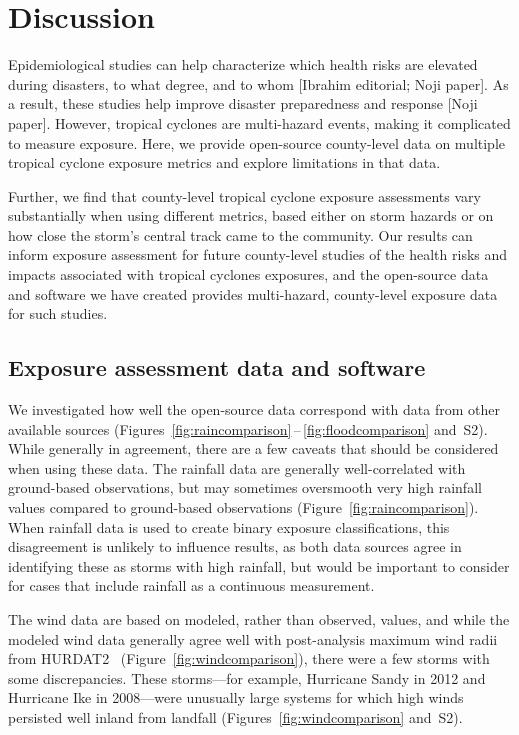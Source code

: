 \section*{Discussion}

Epidemiological studies can help characterize which health risks are elevated
during disasters, to what degree, and to whom [Ibrahim editorial; Noji paper].
As a result, these studies help improve disaster preparedness and response
[Noji paper].  However, tropical cyclones are multi-hazard events, making it
complicated to measure exposure.  Here, we provide open-source county-level
data on multiple tropical cyclone exposure metrics and explore limitations in
that data.  

Further, we find that county-level tropical cyclone exposure assessments vary
substantially when using different metrics, based either on storm hazards or on
how close the storm's central track came to the community. Our results can
inform exposure assessment for future county-level studies of the health risks
and impacts associated with tropical cyclones exposures, and the open-source
data and software we have created provides multi-hazard, county-level exposure
data for such studies.

\subsection*{Exposure assessment data and software}

We investigated how well the open-source data correspond with
data from other available sources
(Figures~\ref{fig:raincomparison}\,--\,\ref{fig:floodcomparison} and~S2). While
generally in agreement, there are a few caveats that should be considered when
using these data. The rainfall data are generally
well-correlated with ground-based observations, but may sometimes
oversmooth very high rainfall values compared to ground-based observations
(Figure~\ref{fig:raincomparison}). When rainfall data is used to create binary
exposure classifications, this disagreement is unlikely to influence results,
as both data sources agree in identifying these as storms with high rainfall,
but would be important to consider for cases that include rainfall as a
continuous measurement. 

The wind data are based on modeled, rather than observed, values, and while the
modeled wind data generally agree well with post-analysis maximum wind radii
from \ac{HURDAT2}~\parencite{landsea2013} (Figure~\ref{fig:windcomparison}),
there were a few storms with some discrepancies. These storms---for example, Hurricane Sandy
in 2012 and Hurricane Ike in 2008---were
unusually large systems for which high winds persisted well inland from
landfall (Figures~\ref{fig:windcomparison}
and~S2). 

